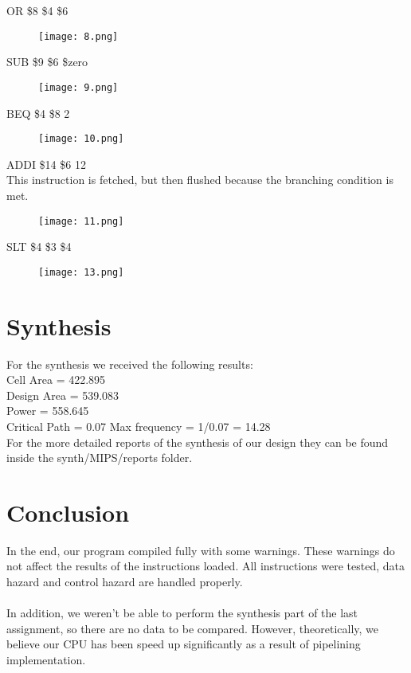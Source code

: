 \documentclass[paper=letter, fontsize=11pt]{scrartcl} %
\numberwithin{equation}{section}
\numberwithin{figure}{section}
\numberwithin{table}{section}
\begin{document}
OR \$8 \$4 \$6	
\begin{figure}[H]
	\centering
		\texttt{[image: 8.png]}
	\label{fig:tests}
\end{figure}
\pagebreak
SUB \$9 \$6 \$zero		
\begin{figure}[H]
	\centering
		\texttt{[image: 9.png]}
	\label{fig:tests}
\end{figure}

BEQ \$4 \$8 2	
\begin{figure}[H]
	\centering
	\texttt{[image: 10.png]}
	\label{fig:tests}
\end{figure}

ADDI \$14 \$6 12	\\	
This instruction is fetched, but then flushed because the branching condition is met.
\begin{figure}[H]
	\centering
	\texttt{[image: 11.png]}
	\label{fig:tests}
\end{figure}
\pagebreak
SLT \$4 \$3 \$4		
\begin{figure}[H]
	\centering
		\texttt{[image: 13.png]}
	\label{fig:tests}
\end{figure}
\pagebreak


\section{Synthesis}
For the synthesis we received the following results:
\\
Cell Area = 422.895
\\
Design Area = 539.083
\\
Power = 558.645
\\
Critical Path = 0.07
Max frequency = 1/0.07 = 14.28
\\
For the more detailed reports of the synthesis of our design they can be found inside the synth/MIPS/reports folder.
\\
\pagebreak

\section{Conclusion}
In the end, our program compiled fully with some warnings. These warnings do not affect the results of the instructions loaded. All instructions were tested, data hazard and control hazard are handled properly.
\\ \\
In addition, we weren't be able to perform the synthesis part of the last assignment, so there are no data to be compared. However, theoretically, we believe our CPU has been speed up significantly as a result of pipelining implementation.
\end{document}
